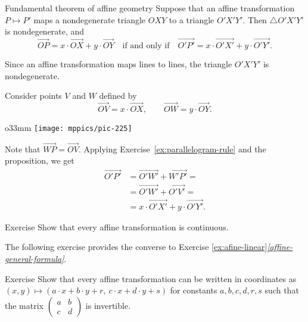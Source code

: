 \begin{thm}{Fundamental theorem of affine geometry}\label{thm:fundamental-theorem-of-affine-geometry}
Suppose that an affine transformation $P\mapsto P'$ maps a nondegenerate triangle $OXY$ to a triangle $O'X'Y'$.
Then $\triangle O'X'Y'$ is nondegenerate, and
\[\overrightarrow{OP}=x\cdot\overrightarrow{OX}+y\cdot\overrightarrow{OY}\quad\text{if and only if}\quad\overrightarrow{O'P'}=x\cdot\overrightarrow{O'X'}+y\cdot\overrightarrow{O'Y'}.\]
\end{thm}

Since an affine transformation maps lines to lines, the triangle
$O'X'Y'$ is nondegenerate.

Consider points $V$ and $W$ defined by
\[\overrightarrow{OV}=x\cdot\overrightarrow{OX},
\qquad
\overrightarrow{OW}=y\cdot\overrightarrow{OY}.
\]

{

\begin{wrapfigure}{o}{33mm}
\centering
\vskip-0mm
\texttt{[image: mppics/pic-225]}
\end{wrapfigure}

Note that 
$\overrightarrow{WP}=\overrightarrow{OV}$.
Applying Exercise~\ref{ex:parallelogram-rule} and the proposition, we get
\begin{align*}\overrightarrow{O'P'}&=\overrightarrow{O'W'}+\overrightarrow{W'P'}=
\\
&=\overrightarrow{O'W'}+\overrightarrow{O'V'}=
\\
&=x\cdot\overrightarrow{O'X'}+y\cdot\overrightarrow{O'Y'}.
\end{align*}
\qedsf

}

\begin{thm}{Exercise}\label{ex:affine-continuous}
Show that every affine transformation is continuous.
\end{thm}

The following exercise provides the converse to Exercise \ref{ex:afine-linear}\textit{\ref{affine-general-formula}}.

\begin{thm}{Exercise}\label{ex:affine-coordinates}
Show that every affine transformation can be written in coordinates as
$(x,y)\mapsto(a\cdot x+b\cdot y+r,\ c\cdot x+d\cdot y+s)$
for constants $a,b,c,d,r,s$ such that the matrix $(\begin{smallmatrix}a&b\\c&d\end{smallmatrix})$ is invertible. 
\end{thm}

